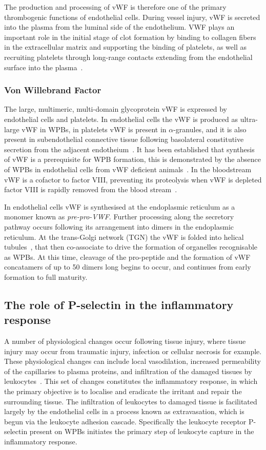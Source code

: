 The production and processing of vWF is therefore one of the primary thrombogenic functions of endothelial cells. During vessel injury, vWF is secreted into the plasma from the luminal side of the endothelium. VWF plays an important role in the initial stage of clot formation by binding to collagen fibers in the extracellular matrix and supporting the binding of platelets, as well as recruiting platelets through long-range contacts extending from the endothelial surface into the plasma~\cite{DeCeunynck2013}.

\subsubsection{Von Willebrand Factor}
The large, multimeric, multi-domain glycoprotein vWF is expressed by endothelial cells and platelets. In endothelial cells the vWF is produced as ultra-large vWF in WPBs, in platelets vWF is present in $\alpha$-granules, and it is also present in  subendothelial connective tissue following basolateral constitutive secretion from the adjacent endotheium~\cite{Sadler1998}. It has been established that synthesis of vWF is a prerequisite for WPB formation, this is demonstrated by the absence of WPBs in endothelial cells from vWF deficient animals~\cite{Serpe2008}. In the bloodstream vWF is a cofactor to factor VIII, preventing its proteolysis when vWF is depleted factor VIII is rapidly removed from the blood stream~\cite{Sadler1998}.

In endothelial cells vWF is synthesised at the endoplasmic reticulum as a monomer known as \emph{pre-pro-VWF}. Further processing along the secretory pathway occurs following its arrangement into dimers in the endoplasmic reticulum. At the trans-Golgi network (TGN) the vWF is folded into helical tubules~\cite{Ewenstein1987}, that then co-associate to drive the formation of organelles recognisable as WPBs. At this time, cleavage of the pro-peptide and the formation of vWF concatamers of up to 50 dimers long begins to occur, and continues from early formation to full maturity.

\subsection{The role of P-selectin in the inflammatory response}
\label{introduction:endothelial_cellular_biology:p-selectin_inflammatory_cascade}
A number of physiological changes occur following tissue injury, where tissue injury may occur from traumatic injury, infection or cellular necrosis for example. These physiological changes can include local vasodilation, increased permeability of the capillaries to plasma proteins, and infiltration of the damaged tissues by leukocytes~\cite{Hall2011}. This set of changes constitutes the inflammatory response, in which the primary objective is to localise and eradicate the irritant and repair the surrounding tissue. The infiltration of leukocytes to damaged tissue is facilitated largely by the endothelial cells in a process known as extravasation, which is begun via the leukocyte adhesion cascade. Specifically the leukocyte receptor P-selectin present on WPBs initiates the primary step of leukocyte capture in the inflammatory response.

